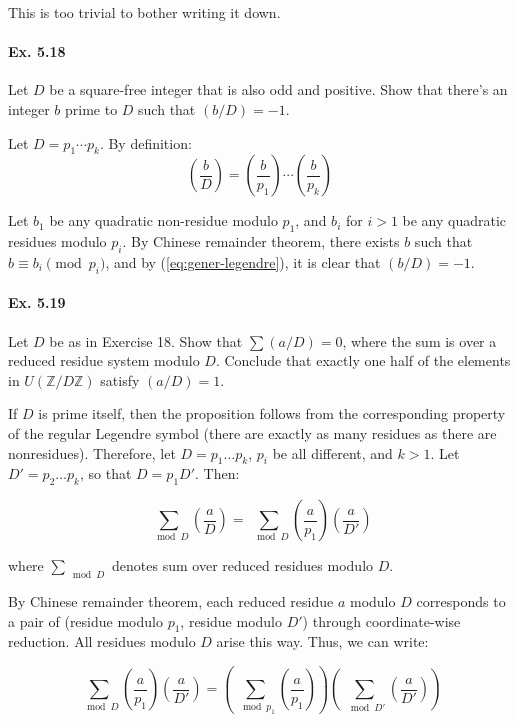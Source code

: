 \documentclass[notitlepage]{article}
\theoremstyle{definition}
\newcommand\Z{\mathbb{Z}}
\begin{document}
This is too trivial to bother writing it down.

\paragraph{Ex. 5.18}
Let $D$ be a square-free integer that is also odd and positive. Show
that there's an integer $b$ prime to $D$ such that $(b/D) = -1$.

Let $D = p_1 \cdots p_k$. By definition:
\begin{equation}
  \label{eq:gener-legendre}
  \left(\frac{b}{D}\right) = \left(\frac{b}{p_1}\right) \cdots \left(\frac{b}{p_k}\right)
\end{equation}

Let $b_1$ be any quadratic non-residue modulo $p_1$, and $b_i$ for $i
> 1$ be any quadratic residues modulo $p_i$. By Chinese remainder
theorem, there exists $b$ such that $b \equiv b_i \pmod {p_i}$, and by
(\ref{eq:gener-legendre}), it is clear that $(b/D) = -1$.

\paragraph{Ex. 5.19}
Let $D$ be as in Exercise 18. Show that $\sum (a/D) = 0$, where the
sum is over a reduced residue system modulo $D$. Conclude that exactly
one half of the elements in $U(\Z/D\Z)$ satisfy $(a/D) = 1$.

If $D$ is prime itself, then the proposition follows from the
corresponding property of the regular Legendre symbol (there are
exactly as many residues as there are nonresidues). Therefore, let $D
= p_1 \ldots p_k$, $p_i$ be all different, and $k > 1$. Let $D' = p_2
\ldots p_k$, so that $D = p_1 D'$. Then:

\begin{equation}
  \sum_{\mod D} \left(\frac{a}{D}\right) = \sum_{\mod D}
  \left(\frac{a}{p_1}\right) \left(\frac{a}{D'}\right)
\end{equation}

where $\sum_{\mod D}$ denotes sum over reduced residues modulo $D$.

By Chinese remainder theorem, each reduced residue $a$ modulo $D$
corresponds to a pair of (residue modulo $p_1$, residue modulo $D'$)
through coordinate-wise reduction. All residues modulo $D$ arise this
way. Thus, we can write:

\begin{equation}
  \sum_{\mod D} \left(\frac{a}{p_1}\right) \left(\frac{a}{D'}\right) =
  \left(\sum_{\mod p_1} \left(\frac{a}{p_1}\right)\right)
  \left(\sum_{\mod D'}\left(\frac{a}{D'}\right)\right)
\end{equation}
\end{document}
